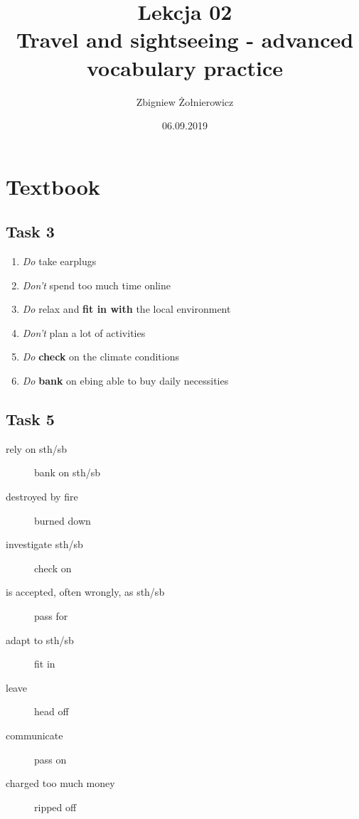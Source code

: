 \documentclass[a4paper]{article}
\begin{document}
    \title{{\huge Lekcja 02} \\
    {\large Travel and sightseeing - advanced vocabulary practice}}
    \author{Zbigniew Żołnierowicz}
    \date{06.09.2019}
    \maketitle
    \section*{Textbook}
        \subsection*{Task 3}
            \begin{enumerate}
                \item \emph{Do} take earplugs
                \item \emph{Don't} spend too much time online
                \item \emph{Do} relax and \textbf{fit in with} the local environment
                \item \emph{Don't} plan a lot of activities
                \item \emph{Do} \textbf{check} on the climate conditions
                \item \emph{Do} \textbf{bank} on ebing able to buy daily necessities
            \end{enumerate}
        \subsection*{Task 5}
            \begin{description}
                \item[rely on sth/sb] bank on sth/sb 
                \item[destroyed by fire] burned down
                \item[investigate sth/sb] check on
                \item[is accepted, often wrongly, as sth/sb] pass for
                \item[adapt to sth/sb] fit in
                \item[leave] head off
                \item[communicate] pass on
                \item[charged too much money] ripped off
            \end{description}
\end{document}
